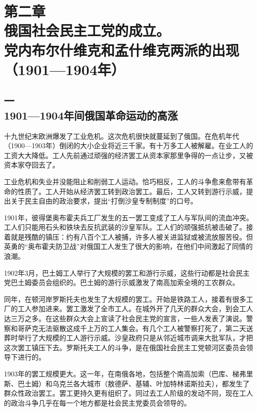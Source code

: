 \section[第二章\q 俄国社会民主工党的成立。党内布尔什维克和孟什维克两派的出现（1901—1904年）]{第二章\\ 俄国社会民主工党的成立。\\ 党内布尔什维克和孟什维克两派的出现\\ {（1901—1904年）}}

\subsection[一\q 1901—1904年间俄国革命运动的高涨]{一\\ 1901—1904年间俄国革命运动的高涨}

十九世纪末欧洲爆发了工业危机。这次危机很快就蔓延到了俄国。在危机年代（1900—1903年）倒闭的大小企业将近三千家。有十万多工人被解雇。在业工人的工资大大降低。工人先前通过顽强的经济罢工从资本家那里争得的一点让步，又被资本家夺回去了。

工业危机和失业并没能阻止和削弱工人运动。恰巧相反，工人的斗争愈来愈带有革命的性质了。工人开始从经济罢工转到政治罢工。最后，工人又转到游行示威，提出关于民主自由的政治要求，提出“打倒沙皇专制制度”的口号。

1901年，彼得堡奥布霍夫兵工厂发生的五一罢工变成了工人与军队间的流血冲突。工人们只能用石头和铁块去反抗武装的沙皇军队。工人们的顽强抵抗被击破了。接着就是残酷的镇压：约有八百个工人被捕，许多人被关进监狱或被流放服苦役。但英勇的“奥布霍夫防卫战”对俄国工人发生了很大的影响，在他们中间激起了同情的浪潮。

1902年3月，巴土姆工人举行了大规模的罢工和游行示威，这些行动都是社会民主党巴土姆委员会组织的。巴土姆的游行示威激发了南高加索全境的工农群众。

同年，在顿河岸罗斯托夫也发生了大规模的罢工。开始是铁路工人，接着有很多工厂的工人参加进来。罢工激发了全市工人。在城外开了几天的群众大会，到会工人达三万之多。在这些群众大会上宣读了社会民主党的宣言，一些人发表了演说。警察和哥萨克无法驱散这成千上万的工人集会。有几个工人被警察打死了，第二天送葬时举行了大规模的工人游行示威。沙皇政府只是从邻近城市调来大批军队，才把这次罢工镇压下去。罗斯托夫工人的斗争，是在俄国社会民主工党顿河区委员会领导下进行的。

1903年的罢工规模更大。这一年，在南俄各地，包括整个南高加索（巴库、梯弗里斯、巴土姆）和乌克兰各大城市（敖德萨、基辅、叶加特林诺斯拉夫），都发生了群众性政治罢工。罢工更持久更有组织了。同过去工人阶级的发动不同，现在工人的政治斗争几乎在每一个地方都是社会民主党委员会领导的。

